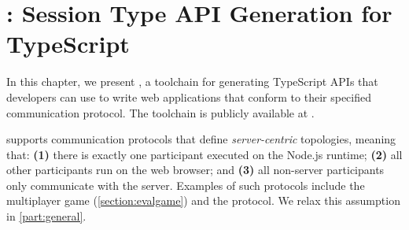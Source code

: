 \chapter{: Session Type API Generation for TypeScript}
\label{chap:codegen}

In this chapter, we present
,
a toolchain for generating TypeScript APIs that developers can
use to write web applications that conform to their specified
communication protocol.
The toolchain is publicly available at \cite{repo}.

 supports communication protocols that define 
\emph{server-centric} topologies, meaning that: 
\textbf{(1)} there is exactly one participant executed on the 
Node.js runtime; 
\textbf{(2)} all other participants run on the web browser; and
\textbf{(3)} all non-server participants only communicate with the server.
Examples of such protocols include the 
multiplayer game (\cref{section:evalgame}) and the  protocol.
We relax this assumption in \cref{part:general}.





